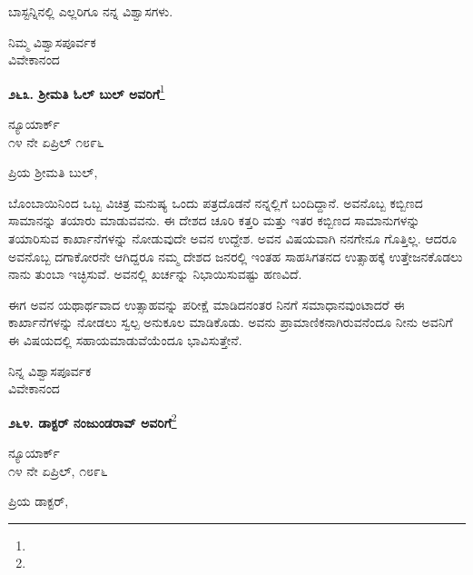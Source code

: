 ಬಾಸ್ಟನ್ನಿನಲ್ಲಿ ಎಲ್ಲರಿಗೂ ನನ್ನ ವಿಶ್ವಾಸಗಳು.

{\flushright
ನಿಮ್ಮ ವಿಶ್ವಾಸಪೂರ್ವಕ\\ವಿವೇಕಾನಂದ\par}

\begin{center}
\textbf{೨೬೩. ಶ‍್ರೀಮತಿ ಓಲ್ ಬುಲ್ ಅವರಿಗೆ}\footnote{}
\end{center}

\begin{flushright}
ನ್ಯೂಯಾರ್ಕ್\\೧೪ ನೇ ಏಪ್ರಿಲ್ ೧೮೯೬
\end{flushright}

\noindent
ಪ್ರಿಯ ಶ‍್ರೀಮತಿ ಬುಲ್,

ಬೊಂಬಾಯಿನಿಂದ ಒಬ್ಬ ವಿಚಿತ್ರ ಮನುಷ್ಯ ಒಂದು ಪತ್ರದೊಡನೆ ನನ್ನಲ್ಲಿಗೆ ಬಂದಿದ್ದಾನೆ. ಅವನೊಬ್ಬ ಕಬ್ಬಿಣದ ಸಾಮಾನನ್ನು ತಯಾರು ಮಾಡುವವನು. ಈ ದೇಶದ ಚೂರಿ ಕತ್ತರಿ ಮತ್ತು ಇತರ ಕಬ್ಬಿಣದ ಸಾಮಾನುಗಳನ್ನು ತಯಾರಿಸುವ ಕಾರ್ಖಾನೆಗಳನ್ನು ನೋಡುವುದೇ ಅವನ ಉದ್ದೇಶ. ಅವನ ವಿಷಯವಾಗಿ ನನಗೇನೂ ಗೊತ್ತಿಲ್ಲ. ಆದರೂ ಅವನೊಬ್ಬ ದಗಾಕೋರನೇ ಆಗಿದ್ದರೂ ನಮ್ಮ ದೇಶದ ಜನರಲ್ಲಿ ಇಂತಹ ಸಾಹಸಿಗತನದ ಉತ್ಸಾಹಕ್ಕೆ ಉತ್ತೇಜನಕೊಡಲು ನಾನು ತುಂಬಾ ಇಚ್ಛಿಸುವೆ. ಅವನಲ್ಲಿ ಖರ್ಚನ್ನು ನಿಭಾಯಿಸುವಷ್ಟು ಹಣವಿದೆ.

ಈಗ ಅವನ ಯಥಾರ್ಥವಾದ ಉತ್ಸಾಹವನ್ನು ಪರೀಕ್ಷೆ ಮಾಡಿದನಂತರ ನಿನಗೆ ಸಮಾಧಾನವುಂಟಾದರೆ ಈ ಕಾರ್ಖಾನೆಗಳನ್ನು ನೋಡಲು ಸ್ವಲ್ಪ ಅನುಕೂಲ ಮಾಡಿಕೊಡು. ಅವನು ಪ್ರಾಮಾಣಿಕನಾಗಿರುವನೆಂದೂ ನೀನು ಅವನಿಗೆ ಈ ವಿಷಯದಲ್ಲಿ ಸಹಾಯಮಾಡುವೆಯೆಂದೂ ಭಾವಿಸುತ್ತೇನೆ.

{\flushright
ನಿನ್ನ ವಿಶ್ವಾಸಪೂರ್ವಕ\\ವಿವೇಕಾನಂದ\par}

\begin{center}
\textbf{೨೬೪. ಡಾಕ್ಟರ್‌ ನಂಜುಂಡರಾವ್ ಅವರಿಗೆ}\footnote{}
\end{center}

\begin{flushright}
ನ್ಯೂಯಾರ್ಕ್\\೧೪ ನೇ ಏಪ್ರಿಲ್, ೧೮೯೬
\end{flushright}

\noindent
ಪ್ರಿಯ ಡಾಕ್ಟರ್,

